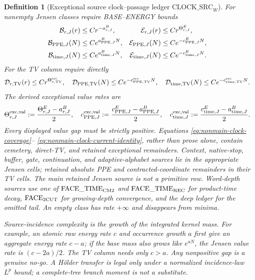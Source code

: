 \documentclass[11pt]{article}
\newtheorem{definition}[theorem]{Definition}
\begin{document}
\begin{definition}[Exceptional source clock--passage ledger
$\mathrm{CLOCK\_SRC}_{W}$]
For nonempty Jensen classes require BASE--ENERGY bounds
\begin{align}
 \mathcal B_{r,J}(r)&\le Cr^{-a_{r,J}^{B}},&
 \mathcal E_{r,J}(r)&\le Cr^{\Theta_{r,J}^{E}},\notag\\
 \mathcal B_{\mathrm{PPE},J}(N)&\le Ce^{a_{\mathrm{PPE},J}^{B}N},&
 \mathcal E_{\mathrm{PPE},J}(N)&\le Ce^{-c_{\mathrm{PPE},J}^{E}N},\notag\\
 \mathcal B_{\mathrm{time},J}(N)&\le Ce^{a_{\mathrm{time},J}^{B}N},&
 \mathcal E_{\mathrm{time},J}(N)&\le Ce^{-c_{\mathrm{time},J}^{E}N}.
 \label{eq:clock-source-matrix-tails}
\end{align}
For the TV column require directly
\begin{equation}
\label{eq:clock-source-TV-tails}
 \mathcal D_{r,\mathrm{TV}}(r)\le Cr^{\Theta_{r,\mathrm{TV}}^{\rm src}},
 \quad
 \mathcal D_{\mathrm{PPE},\mathrm{TV}}(N)
     \le Ce^{-c_{\mathrm{PPE},\mathrm{TV}}^{\rm src}N},
 \quad
 \mathcal D_{\mathrm{time},\mathrm{TV}}(N)
     \le Ce^{-c_{\mathrm{time},\mathrm{TV}}^{\rm src}N}.
\end{equation}
The derived exceptional value rates are
\begin{equation}
\label{eq:exceptional-Jensen-value-rates}
 \Theta_{r,J}^{\rm exc,val}:=
   \frac{\Theta_{r,J}^{E}-a_{r,J}^{B}}2,
 \quad
 c_{\mathrm{PPE},J}^{\rm exc,val}:=
   \frac{c_{\mathrm{PPE},J}^{E}-a_{\mathrm{PPE},J}^{B}}2,
 \quad
 c_{\mathrm{time},J}^{\rm exc,val}:=
   \frac{c_{\mathrm{time},J}^{E}-a_{\mathrm{time},J}^{B}}2.
\end{equation}
Every displayed value gap must be strictly positive.  Equations
\eqref{eq:nonmain-clock-coverage}--
\eqref{eq:nonmain-clock-current-identity}, rather than prose alone, contain
cemetery, direct-TV, and retained exceptional remainders.  Context,
native-stop, buffer, gate, continuation, and adaptive-alphabet sources lie in the
appropriate Jensen cells; retained absolute PPE and contracted-coordinate
remainders in their TV cells.  The main retained Jensen source is not a
primitive row.  Word-depth sources use
one of $\mathrm{FACE\_TIME}_{\rm CM2}$ and
$\mathrm{FACE\_TIME}_{\rm REC}$ for product-time decay,
$\mathrm{FACE}_{\rm 2CUT}$ for growing-depth convergence, and the deep
ledger for the omitted tail.  An empty class has rate
$+\infty$ and disappears from minima.

Source-incidence complexity is the growth of the integrated kernel mass.
For example, an atomic raw energy rate $c$ and occurrence growth $a$ first
give an aggregate energy rate $c-a$; if the base mass also grows like
$e^{aN}$, the Jensen value rate is $(c-2a)/2$.  The TV column needs only
$c>a$.  Any nonpositive gap is a genuine no-go.  A H\"older transfer is
legal only under a normalized incidence-law $L^p$ bound; a complete-tree
branch moment is not a substitute.
\end{definition}
\end{document}
